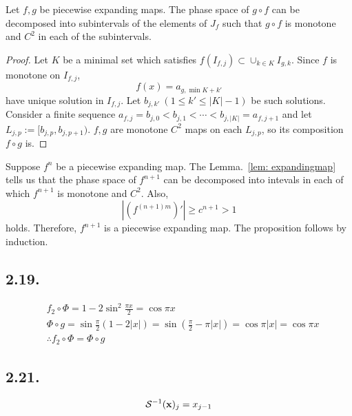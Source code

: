 \documentclass[a4paper,11pt,fleqn]{article}
\begin{document}
\begin{lemma}\label{lem: expandingmap}\mbox{}\par 
Let $f, g$ be piecewise expanding maps. The phase space of $g\circ f$ can be decomposed into subintervals of the elements of $J_f$ such that $g\circ f$ is monotone and $C^2$ in each of the subintervals.  
\end{lemma}
\begin{proof}\mbox{}\par
Let $K$ be a minimal set which satisfies $f(I_{f,j})\subset \cup_{k\in K}I_{g,k}$. Since $f$ is monotone on $I_{f,j}$, 
\begin{equation}
    f(x) = a_{g,\min{K}+k'} \label{eq: eqnedge}
\end{equation}
have unique solution in $I_{f,j}$. Let $b_{j,k'} \ (1 \le k' \le |K|-1)$ be such solutions. 
Consider a finite sequence $a_{f,j} = b_{j,0} < b_{j,1} < \cdots < b_{j,|K|} = a_{f,j+1}$ and let $L_{j,p} := [b_{j,p},b_{j,p+1})$. 
$f, g$ are monotone $C^2$ maps on each $L_{j,p}$, so its composition $f \circ g$ is. 
\end{proof}
Suppose $f^n$ be a piecewise expanding map. The Lemma.~\ref{lem: expandingmap} tells us that the phase space of $f^{n+1}$ can be decomposed into intevals in each of which $f^{n+1}$ is monotone and $C^2$. 
Also, 
\begin{equation}
    |(f^{(n+1)m})'| \ge c^{n+1} >1
\end{equation}
holds. Therefore, $f^{n+1}$ is a piecewise expanding map. The proposition follows by induction. 
\hruleskip

\subsection{2.19.}
\begin{align}
    &f_2 \circ \Phi = 1-2\sin^2{\frac{\pi x}{2}} = \cos{\pi x} \nonumber \\
    &\Phi \circ g = \sin{\frac{\pi}{2}\left(1-2|x|\right)} = \sin\left({\frac{\pi}{2}-\pi |x|}\right) =\cos{\pi |x|} =\cos{\pi x} \nonumber \\
    &\therefore  f_2 \circ \Phi = \Phi \circ g
\end{align}

\hruleskip

\subsection{2.21.}
\begin{equation}
    \mathcal{S}^{-1}({\bf x})_j = x_{j-1}
\end{equation}
\end{document}
